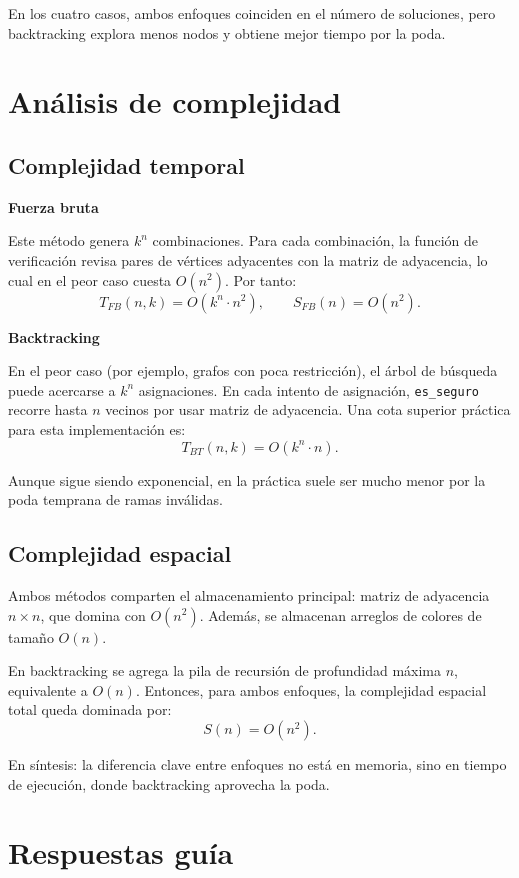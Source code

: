 \documentclass[12pt,a4paper]{article}
\begin{document}
En los cuatro casos, ambos enfoques coinciden en el número de soluciones,
pero backtracking explora menos nodos y obtiene mejor tiempo por la poda.

\section{Análisis de complejidad}

\subsection{Complejidad temporal}

\textbf{Fuerza bruta}

Este método genera \(k^n\) combinaciones. Para cada combinación, la función
de verificación revisa pares de vértices adyacentes con la matriz de adyacencia,
lo cual en el peor caso cuesta \(O(n^2)\). Por tanto:
\[
T_{FB}(n,k)=O(k^n\cdot n^2), \qquad S_{FB}(n)=O(n^2).
\]

\textbf{Backtracking}

En el peor caso (por ejemplo, grafos con poca restricción), el árbol de
búsqueda puede acercarse a \(k^n\) asignaciones. En cada intento de asignación,
\texttt{es\_seguro} recorre hasta \(n\) vecinos por usar matriz de adyacencia.
Una cota superior práctica para esta implementación es:
\[
T_{BT}(n,k)=O(k^n\cdot n).
\]

Aunque sigue siendo exponencial, en la práctica suele ser mucho menor por la
poda temprana de ramas inválidas.

\subsection{Complejidad espacial}

Ambos métodos comparten el almacenamiento principal: matriz de adyacencia
\(n\times n\), que domina con \(O(n^2)\). Además, se almacenan arreglos de
colores de tamaño \(O(n)\).

En backtracking se agrega la pila de recursión de profundidad máxima \(n\),
equivalente a \(O(n)\). Entonces, para ambos enfoques, la complejidad espacial
total queda dominada por:
\[
S(n)=O(n^2).
\]

En síntesis: la diferencia clave entre enfoques no está en memoria, sino en
tiempo de ejecución, donde backtracking aprovecha la poda.

\section{Respuestas guía}
\end{document}
